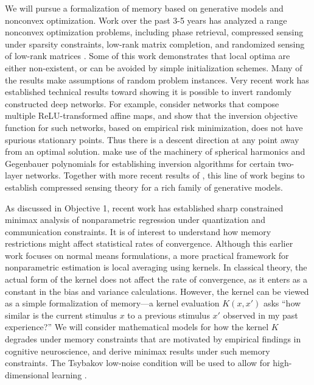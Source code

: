 We will pursue a formalization of memory based on generative models
and nonconvex optimization. Work over the past 3-5 years has analyzed a range nonconvex
optimization problems, including phase retrieval, compressed
sensing under sparsity constraints, low-rank matrix
completion, and randomized sensing of low-rank matrices
\citep{phaselift1,phaselift2,phaselift3,ZhaWanLiu15,WeiCaiCha16,ZheLaf15}.
Some of this work demonstrates that local optima are either
non-existent, or can be avoided by simple initialization schemes. Many
of the results make assumptions of random problem instances. Very
recent work has established technical results toward showing it is
possible to invert randomly constructed deep networks. For example,
\citet{HandV17} consider networks that compose multiple ReLU-transformed affine
maps, and show that the inversion objective function for such networks, based
on empirical risk minimization, does not have spurious stationary
points. Thus there is a descent direction at any point away from an optimal solution.
\citet{Mixon18} make use of the machinery of spherical harmonics and Gegenbauer polynomials for
establishing inversion algorithms for certain two-layer
networks. Together with more recent results of \citet{HandV18}, this
line of work begins to establish compressed sensing theory for a rich
family of generative models.


As discussed in Objective 1, recent work has established 
sharp constrained minimax analysis of nonparametric
regression under quantization and communication
constraints.
It is of interest to understand how memory restrictions might affect
statistical rates of convergence. Although this earlier work focuses on
normal means formulations, a more practical framework for
nonparametric estimation is local averaging using kernels. In
classical theory, the actual form of the kernel does not affect the
rate of convergence, as it enters as a constant in the bias and
variance calculations. However, the kernel can be viewed as a
simple formalization of memory---a kernel evaluation $K(x,x')$ asks
``how similar is the current stimulus $x$ to a previous stimulus $x'$
observed in my past experience?'' We will consider mathematical models for
how the kernel $K$ degrades under memory constraints that
are motivated by empirical findings in cognitive neuroscience,
and derive minimax results under such memory constraints. The
Tsybakov low-noise condition will be used to allow for
high-dimensional learning \citep{mammen1999,tsybakov2004,audibert2007}.

